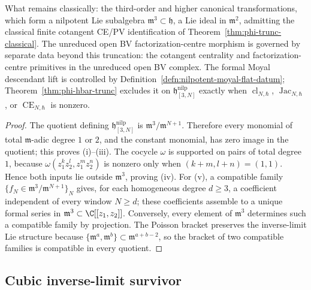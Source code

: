 \begin{prop}
\begin{enumerate}
\end{enumerate}
What remains classically: the third-order and higher canonical
transformations, which form a nilpotent Lie subalgebra
$\mathfrak m^3\subset\mathfrak h$, a Lie ideal in $\mathfrak m^2$,
admitting the classical finite cotangent CE/PV identification
of Theorem~\ref{thm:phi-trunc-classical}.
The unreduced open BV factorization-centre morphism is governed by
separate data beyond this truncation: the cotangent centrality and
factorization-centre primitives in the unreduced open BV complex.  The
formal Moyal descendant lift is controlled by
Definition~\ref{defn:nilpotent-moyal-flat-datum}; Theorem~\ref{thm:phi-hbar-trunc}
excludes it on \(\mathfrak h^{\mathrm{nilp}}_{[3,N]}\) exactly when
\(\operatorname{cl}_{N,\hbar}\), \(\operatorname{Jac}_{N,\hbar}\), or
\(\operatorname{CE}_{N,\hbar}\) is nonzero.
\end{prop}

\begin{proof}
The quotient defining \(\mathfrak h^{\mathrm{nilp}}_{[3,N]}\) is
\(\mathfrak m^3/\mathfrak m^{N+1}\).  Therefore every monomial of total
\(\mathfrak m\)-adic degree \(1\) or \(2\), and the constant monomial,
has zero image in the quotient; this proves (i)--(iii).  The cocycle
\(\omega\) is supported on pairs of total degree \(1\), because
\(\omega(z_1^kz_2^l,z_1^mz_2^n)\) is nonzero only when
\((k+m,l+n)=(1,1)\).  Hence both inputs lie outside
\(\mathfrak m^3\), proving (iv).  For (v), a compatible family
\(\{f_N\in\mathfrak m^3/\mathfrak m^{N+1}\}_N\) gives, for each
homogeneous degree \(d\geq3\), a coefficient independent of every
window \(N\geq d\); these coefficients assemble to a unique formal
series in \(\mathfrak m^3\subset\C[[z_1,z_2]]\).  Conversely, every
element of \(\mathfrak m^3\) determines such a compatible family by
projection.  The Poisson bracket preserves the inverse-limit Lie
structure because
\(\{\mathfrak m^a,\mathfrak m^b\}\subset\mathfrak m^{a+b-2}\), so the
bracket of two compatible families is compatible in every quotient.
\end{proof}

\subsection*{Cubic inverse-limit survivor}


